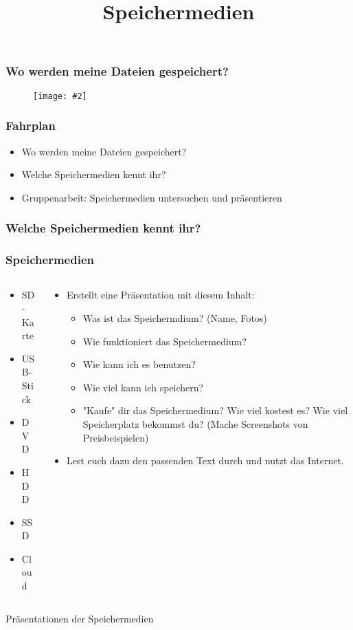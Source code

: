 \documentclass{beamer}
\title{Speichermedien}
\subtitle{}
\date{}
\makeatletter
\newcommand{\fitimage}[2][\@nil]{
  \begin{figure}
    \begin{adjustbox}{width=0.9\textwidth, totalheight=\textheight-2\baselineskip-2\baselineskip,keepaspectratio}
      \texttt{[image: \#2]}
    \end{adjustbox}
    \def\tmp{#1}%
   \ifx\tmp\@nnil
      \else
      \caption{#1}
    \fi
  \end{figure}
}
\makeatother
\begin{document}
\frame{\titlepage}

\begin{frame}
  \frametitle{Wo werden meine Dateien gespeichert?}
  \fitimage{./foto_machen.excalidraw.png}

\end{frame}

\begin{frame}
  \frametitle{Fahrplan}
  \begin{itemize}
    \item Wo werden meine Dateien gespeichert?
    \item Welche Speichermedien kennt ihr?
    \item Gruppenarbeit: Speichermedien untersuchen und präsentieren
  \end{itemize}
\end{frame}


\begin{frame}
  \frametitle{Welche Speichermedien kennt ihr?}
\end{frame}

\begin{frame}
  \frametitle{Speichermedien}
  \begin{columns}
    \begin{column}{0.3\textwidth}
      \begin{itemize}
        \item {} SD-Karte
        \item {} USB-Stick
        \item {} DVD
        \item {} HDD
        \item {} SSD
        \item {} Cloud
      \end{itemize}
    \end{column}
    \begin{column}{0.7\textwidth}
      \begin{itemize}
        \item Erstellt eine Präsentation mit diesem Inhalt:
              \begin{itemize}
                \item Was ist das Speichermdium? (Name, Fotos)
                \item Wie funktioniert das Speichermedium?
                \item Wie kann ich es benutzen?
                \item Wie viel kann ich speichern?
                \item "Kaufe" dir das Speichermedium? Wie viel kostest es? Wie viel Speicherplatz bekommst du? (Mache Screenshots von Preisbeispielen)
              \end{itemize}
        \item Lest euch dazu den passenden Text durch und nutzt das Internet.
      \end{itemize}
    \end{column}
  \end{columns}
\end{frame}

\begin{frame}[standout]
  Präsentationen der Speichermedien
\end{frame}
\end{document}
